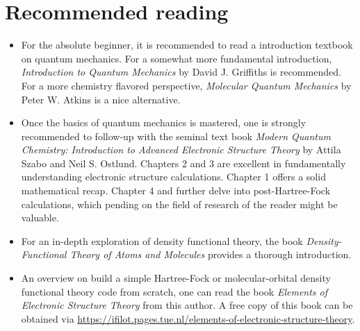 %
%
%
\section{Recommended reading}
\label{chap:further_reading}

\begin{itemize}
    \item For the absolute beginner, it is recommended to read a introduction textbook on quantum mechanics. For a somewhat more fundamental introduction, \textit{Introduction to Quantum Mechanics}\cite{2004:griffiths} by David J. Griffiths is recommended. For a more chemistry flavored perspective, \textit{Molecular Quantum Mechanics}\cite{2011:atkins} by Peter W. Atkins is a nice alternative.
    
    \item Once the basics of quantum mechanics is mastered, one is strongly recommended to follow-up with the seminal text book \textit{Modern Quantum Chemistry: Introduction to Advanced Electronic Structure Theory}\cite{szabo} by Attila Szabo and Neil S. Ostlund. Chapters 2 and 3 are excellent in fundamentally understanding electronic structure calculations. Chapter 1 offers a solid mathematical recap. Chapter 4 and further delve into post-Hartree-Fock calculations, which pending on the field of research of the reader might be valuable.

    \item For an in-depth exploration of density functional theory, the book \textit{Density-Functional Theory of Atoms and Molecules}\cite{1994:parr} provides a thorough introduction.

    \item An overview on build a simple Hartree-Fock or molecular-orbital density functional theory code from scratch, one can read the book \textit{Elements of Electronic Structure Theory} from this author. A free copy of this book can be obtained via \url{https://ifilot.pages.tue.nl/elements-of-electronic-structure-theory}.
    
\end{itemize}